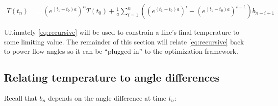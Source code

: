 \documentclass[conference]{IEEEtran}
\begin{document}
\begin{align}\label{eq:recursive}
T(t_n) &= (e^{(t_1 - t_0)a})^n T(t_0) + \frac{1}{a} \sum_{i=1}^n \left( (e^{(t_1-t_0)a})^i - (e^{(t_1-t_0)a})^{i-1} \right)b_{n-i+1}
\end{align}

Ultimately \eqref{eq:recursive} will be used to constrain a line's final temperature to some limiting value. The remainder of this section will relate \eqref{eq:recursive} back to power flow angles so it can be ``plugged in'' to the optimization framework.

\subsection{Relating temperature to angle differences}

Recall that $b_n$ depends on the angle difference at time $t_n$:
\end{document}
